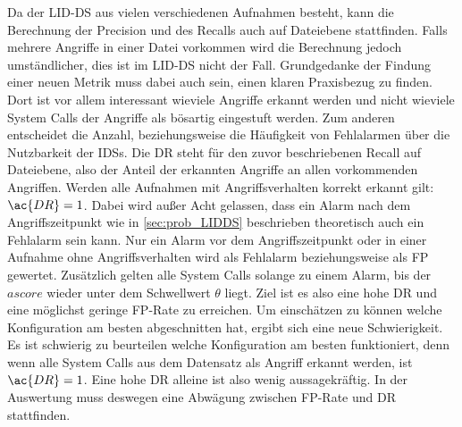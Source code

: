     Da der \ac{LID-DS} aus vielen verschiedenen Aufnahmen besteht, kann die Berechnung der Precision und des Recalls auch auf Dateiebene stattfinden.
    Falls mehrere Angriffe in einer Datei vorkommen wird die Berechnung jedoch umständlicher, dies ist im \ac{LID-DS} nicht der Fall.  
    Grundgedanke der Findung einer neuen Metrik muss dabei auch sein, einen klaren Praxisbezug zu finden. 
    Dort ist vor allem interessant wieviele Angriffe erkannt werden und nicht wieviele System Calls der Angriffe als bösartig eingestuft werden.
    Zum anderen entscheidet die Anzahl, beziehungsweise die Häufigkeit von Fehlalarmen über die Nutzbarkeit der \acp{IDS}.
    Die \ac{DR} steht für den zuvor beschriebenen Recall auf Dateiebene, also der Anteil der erkannten Angriffe an allen vorkommenden Angriffen.
    Werden alle Aufnahmen mit Angriffsverhalten korrekt erkannt gilt: $\ac{DR}=1$.
    Dabei wird außer Acht gelassen, dass ein Alarm nach dem Angriffszeitpunkt wie in \autoref{sec:prob_LIDDS} beschrieben theoretisch auch ein Fehlalarm sein kann.
    Nur ein Alarm vor dem Angriffszeitpunkt oder in einer Aufnahme ohne Angriffsverhalten wird als Fehlalarm beziehungsweise als \ac{FP} gewertet.
    Zusätzlich gelten alle System Calls solange zu einem Alarm, bis der $ascore$ wieder unter dem Schwellwert $\theta$ liegt.
    Ziel ist es also eine hohe \ac{DR} und eine möglichst geringe \ac{FP}-Rate zu erreichen.
    Um einschätzen zu können welche Konfiguration am besten abgeschnitten hat, ergibt sich eine neue Schwierigkeit.
    Es ist schwierig zu beurteilen welche Konfiguration am besten funktioniert, denn wenn alle System Calls aus dem Datensatz als Angriff erkannt werden, ist $\ac{DR}=1$.
    Eine hohe \ac{DR} alleine ist also wenig aussagekräftig.
    In der Auswertung muss deswegen eine Abwägung zwischen \ac{FP}-Rate und \ac{DR} stattfinden.
